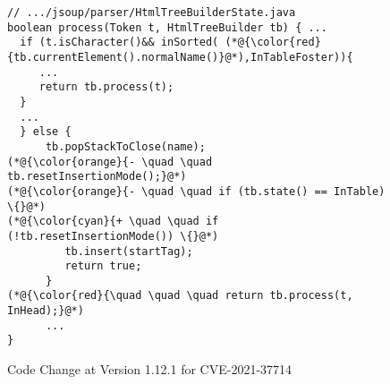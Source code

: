 \begin{figure}[t]
	\centering
	\begin{lstlisting}[]
// .../jsoup/parser/HtmlTreeBuilderState.java
boolean process(Token t, HtmlTreeBuilder tb) { ...
  if (t.isCharacter()&& inSorted( (*@{\color{red}{tb.currentElement().normalName()}@*),InTableFoster)){
     ...
     return tb.process(t);
  }
  ...
  } else {
      tb.popStackToClose(name);
(*@{\color{orange}{- \quad \quad tb.resetInsertionMode();}@*)
(*@{\color{orange}{- \quad \quad if (tb.state() == InTable) \{}@*)
(*@{\color{cyan}{+ \quad \quad if (!tb.resetInsertionMode()) \{}@*)
         tb.insert(startTag);
         return true;
      }
(*@{\color{red}{\quad \quad \quad return tb.process(t, InHead);}@*)
      ...
}
	\end{lstlisting}
        \vspace{-19pt}
        \caption{Code Change at Version 1.12.1 for CVE-2021-37714}
        \vspace{-6pt}
        \label{fig:motiv-code}
\end{figure}



